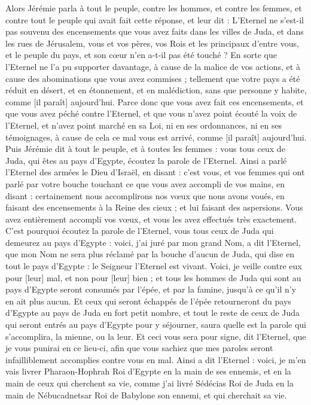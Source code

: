 \begin{multicols}{2}
Alors Jérémie parla à tout le peuple, contre les hommes, et contre les femmes, et contre tout le peuple qui avait fait cette réponse, et leur dit :
L'Eternel ne s'est-il pas souvenu des encensements que vous avez faits dans les villes de Juda, et dans les rues de Jérusalem, vous et vos pères, vos Rois et les principaux d'entre vous, et le peuple du pays, et son cœur n'en a-t-il pas été touché ?
En sorte que l'Eternel ne l'a pu supporter davantage, à cause de la malice de vos actions, et à cause des abominations que vous avez commises ; tellement que votre pays a été réduit en désert, et en étonnement, et en malédiction, sans que personne y habite, comme [il paraît] aujourd'hui.
Parce donc que vous avez fait ces encensements, et que vous avez péché contre l'Eternel, et que vous n'avez point écouté la voix de l'Eternel, et n'avez point marché en sa Loi, ni en ses ordonnances, ni en ses témoignages, à cause de cela ce mal vous est arrivé, comme [il paraît] aujourd'hui.
Puis Jérémie dit à tout le peuple, et à toutes les femmes : vous tous ceux de Juda, qui êtes au pays d'Egypte, écoutez la parole de l'Eternel.
Ainsi a parlé l'Eternel des armées le Dieu d'Israël, en disant : c'est vous, et vos femmes qui ont parlé par votre bouche touchant ce que vous avez accompli de vos mains, en disant : certainement nous accomplirons nos vœux que nous avons voués, en faisant des encensements à la Reine des cieux ; et lui faisant des aspersions. Vous avez entièrement accompli vos vœux, et vous les avez effectués très exactement.
C'est pourquoi écoutez la parole de l'Eternel, vous tous ceux de Juda qui demeurez au pays d'Egypte : voici, j'ai juré par mon grand Nom, a dit l'Eternel, que mon Nom ne sera plus réclamé par la bouche d'aucun de Juda, qui dise en tout le pays d'Egypte : le Seigneur l'Eternel est vivant.
Voici, je veille contre eux pour [leur] mal, et non pour [leur] bien ; et tous les hommes de Juda qui sont au pays d'Egypte seront consumés par l'épée, et par la famine, jusqu’à ce qu'il n'y en ait plus aucun.
Et ceux qui seront échappés de l'épée retourneront du pays d'Egypte au pays de Juda en fort petit nombre, et tout le reste de ceux de Juda qui seront entrés au pays d'Egypte pour y séjourner, saura quelle est la parole qui s'accomplira, la mienne, ou la leur.
Et ceci vous sera pour signe, dit l'Eternel, que je vous punirai en ce lieu-ci, afin que vous sachiez que mes paroles seront infailliblement accomplies contre vous en mal.
Ainsi a dit l'Eternel : voici, je m'en vais livrer Pharaon-Hophrah Roi d'Egypte en la main de ses ennemis, et en la main de ceux qui cherchent sa vie, comme j'ai livré Sédécias Roi de Juda en la main de Nébucadnetsar Roi de Babylone son ennemi, et qui cherchait sa vie.

\end{multicols}
